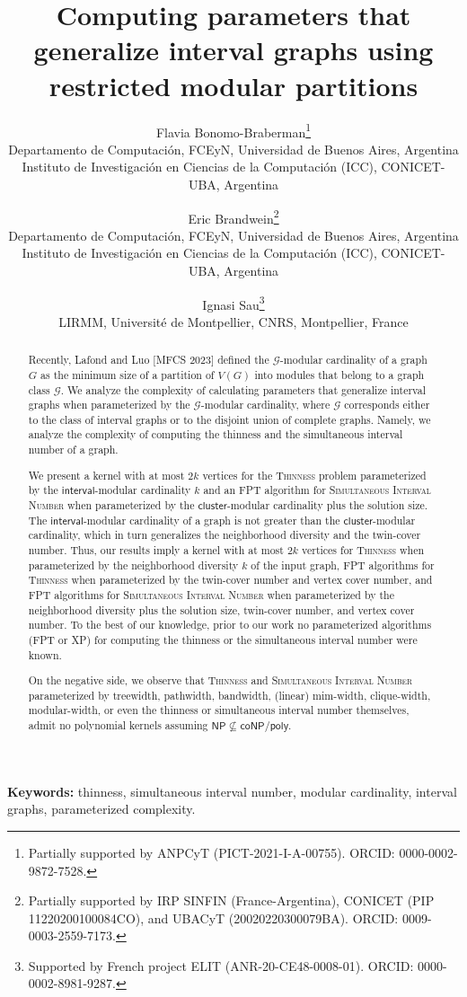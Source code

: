\documentclass[11pt]{article}
\title{Computing parameters that generalize interval graphs using restricted modular partitions}
\author{
  Flavia Bonomo-Braberman\thanks{Partially supported by ANPCyT (PICT-2021-I-A-00755). ORCID: 0000-0002-9872-7528.} \\
  \small Departamento de Computaci\'{o}n, FCEyN, Universidad de Buenos Aires, Argentina \\
  \small Instituto de Investigaci\'{o}n en Ciencias de la Computaci\'{o}n (ICC), CONICET-UBA, Argentina
  \and
  Eric Brandwein\thanks{Partially supported by IRP SINFIN (France-Argentina), CONICET (PIP 11220200100084CO), and UBACyT (20020220300079BA). ORCID: 0009-0003-2559-7173.} \\
  \small Departamento de Computaci\'{o}n, FCEyN, Universidad de Buenos Aires, Argentina \\
  \small Instituto de Investigaci\'{o}n en Ciencias de la Computaci\'{o}n (ICC), CONICET-UBA, Argentina
  \and
  Ignasi Sau\thanks{Supported by French project ELIT (ANR-20-CE48-0008-01). ORCID: 0000-0002-8981-9287.} \\
  \small LIRMM, Universit\'{e} de Montpellier, CNRS, Montpellier, France
}
\date{}
\theoremstyle{plain}
\theoremstyle{definition}
\theoremstyle{remark}
\begin{document}
\maketitle

\begin{abstract}
Recently, Lafond and Luo [MFCS 2023] defined the $\mathcal{G}$-modular cardinality of a graph $G$ as the minimum size of a partition of $V(G)$ into modules that belong to a graph class $\mathcal{G}$. We analyze the complexity of calculating parameters that generalize interval graphs when parameterized by the $\mathcal{G}$-modular cardinality, where $\mathcal{G}$ corresponds either to the class of interval graphs or to the disjoint union of complete graphs. Namely, we analyze the complexity of computing the thinness and the simultaneous interval number of a graph.

We present a kernel with at most $2k$ vertices for the \textsc{Thinness} problem parameterized by the $\textsf{interval}$-modular cardinality $k$ and an \textsf{FPT} algorithm for \textsc{Simultaneous Interval Number} when parameterized by the $\textsf{cluster}$-modular cardinality plus the solution size. The $\textsf{interval}$-modular cardinality of a graph is not greater than the $\textsf{cluster}$-modular cardinality, which in turn generalizes the neighborhood diversity and the twin-cover number. Thus, our results imply a kernel with at most $2k$ vertices for \textsc{Thinness} when parameterized by the neighborhood diversity $k$ of the input graph, \textsf{FPT} algorithms for \textsc{Thinness} when parameterized by the twin-cover number and vertex cover number, and \textsf{FPT} algorithms for \textsc{Simultaneous Interval Number} when parameterized by the neighborhood diversity plus the solution size, twin-cover number, and vertex cover number. To the best of our knowledge, prior to our work no parameterized algorithms (\textsf{FPT} or \textsf{XP}) for computing the thinness or the simultaneous interval number were known.

On the negative side, we observe that \textsc{Thinness} and \textsc{Simultaneous Interval Number} parameterized by tree\-width, pathwidth, bandwidth, (linear) mim-width, clique-width, modular-width, or even the thinness or simultaneous interval number themselves, admit no polynomial kernels assuming $\mathsf{NP} \not\subseteq \mathsf{coNP}/\mathsf{poly}$.
\end{abstract}

\noindent\textbf{Keywords:} thinness, simultaneous interval number, modular cardinality, interval graphs, parameterized complexity.
\end{document}

